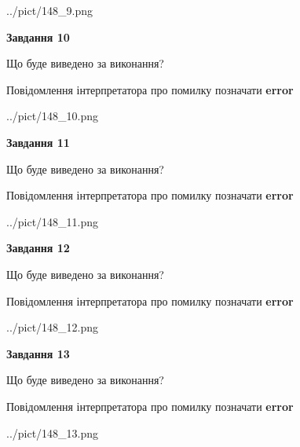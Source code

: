 \documentclass[11pt, ukrainian]{article}
\begin{document}
{\begin {large}
\begin{center}
	{../pict/148_9.png}
\end{center}
\newpage

{\begin {center}\textbf{Завдання 10}\end {center}}\par
Що буде виведено за виконання? \par
Повідомлення інтерпретатора про помилку позначати \textbf{error}

\begin{center}
	{../pict/148_10.png}
\end{center}
\newpage

{\begin {center}\textbf{Завдання 11}\end {center}}\par
Що буде виведено за виконання? \par
Повідомлення інтерпретатора про помилку позначати \textbf{error}

\begin{center}
	{../pict/148_11.png}
\end{center}
\newpage

{\begin {center}\textbf{Завдання 12}\end {center}}\par
Що буде виведено за виконання? \par
Повідомлення інтерпретатора про помилку позначати \textbf{error}

\begin{center}
	{../pict/148_12.png}
\end{center}
\newpage

{\begin {center}\textbf{Завдання 13}\end {center}}\par
Що буде виведено за виконання? \par
Повідомлення інтерпретатора про помилку позначати \textbf{error}

\begin{center}
	{../pict/148_13.png}
\end{center}
\newpage


\end{large}}
\end{document}

